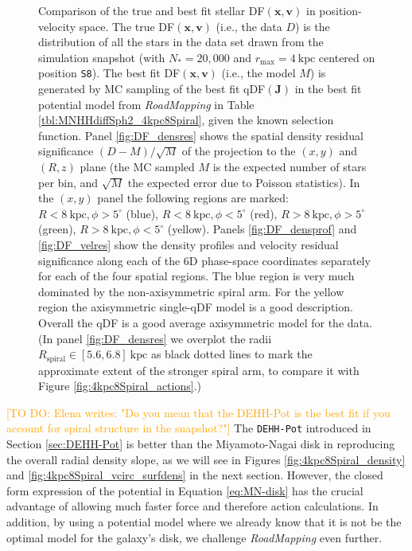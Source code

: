 \documentclass[iop,revtex4,numberedappendix,appendixfloats]{emulateapj}
\newcommand{\vect}[1]{\boldsymbol{#1}}
\newcommand{\RM}{{\sl RoadMapping}}
\newcommand{\Elena}[1]{\textcolor{Orange}{#1}}
\begin{document}
\begin{figure}[!htbp]
  \caption{Comparison of the true and best fit stellar DF$(\vect{x},\vect{v})$ in position-velocity space. The true DF$(\vect{x},\vect{v})$ (i.e., the data $D$) is the distribution of all the stars in the data set drawn from the simulation snapshot (with $N_*=20,000$ and $r_\text{max}=4~\text{kpc}$ centered on position \texttt{S8}). The best fit DF$(\vect{x},\vect{v})$ (i.e., the model $M$) is generated by MC sampling of the best fit qDF$(\vect{J})$ in the best fit potential model from \RM{} in Table \ref{tbl:MNHHdiffSph2_4kpc8Spiral}, given the known selection function. Panel \ref{fig:DF_densres} shows the spatial density residual significance $(D-M)/\sqrt{M}$ of the projection to the $(x,y)$ and $(R,z)$ plane (the MC sampled $M$ is the expected number of stars per bin, and $\sqrt{M}$ the expected error due to Poisson statistics). In the $(x,y)$ panel the following regions are marked: $R<8~\text{kpc},\phi>5^\circ$ (blue), $R<8~\text{kpc},\phi<5^\circ$ (red), $R>8~\text{kpc},\phi>5^\circ$ (green), $R>8~\text{kpc},\phi<5^\circ$ (yellow). Panels \ref{fig:DF_densprof} and \ref{fig:DF_velres} show the density profiles and velocity residual significance along each of the 6D phase-space coordinates separately for each of the four spatial regions. The blue region is very much dominated by the non-axisymmetric spiral arm. For the yellow region the axisymmetric single-qDF model is a good description. Overall the qDF is a good average axisymmetric model for the data. (In panel \ref{fig:DF_densres} we overplot the radii $R_\text{spiral} \in [5.6,6.8]~\text{kpc}$ as black dotted lines to mark the approximate extent of the stronger spiral arm, to compare it with Figure \ref{fig:4kpc8Spiral_actions}.)}
  \label{fig:4kpc8Spiral_DF_comparison}
\end{figure}

\Elena{[TO DO: Elena writes: "Do you mean that the DEHH-Pot is the best fit if you account for spiral structure in the snapshot?"]} The \texttt{DEHH-Pot} introduced in Section \ref{sec:DEHH-Pot} is better than the Miyamoto-Nagai disk in reproducing the overall radial density slope, as we will see in Figures \ref{fig:4kpc8Spiral_density} and \ref{fig:4kpc8Spiral_vcirc_surfdens} in the next section. However, the closed form expression of the potential in Equation \eqref{eq:MN-disk} has the crucial advantage of allowing much faster force and therefore action calculations. In addition, by using a potential model where we already know that it is not be the optimal model for the galaxy's disk, we challenge \RM{} even further.
\end{document}
